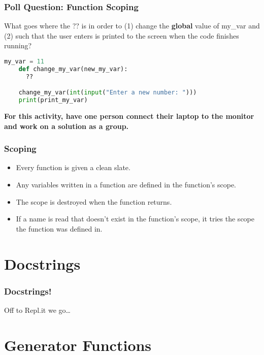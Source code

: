 \documentclass{beamer}
\begin{document}
%
%
%
\begin{frame}[fragile]
  \frametitle{Poll Question: Function Scoping}
  What goes where the ?? is in order to (1) change the \textbf{global} value of my\_var and (2) such that the user enters is printed to the screen when the code finishes running?
  \begin{lstlisting}[language=Python, autogobble]
    my_var = 11
    def change_my_var(new_my_var):
      ??

    change_my_var(int(input("Enter a new number: ")))
    print(print_my_var)
  \end{lstlisting}
  \vfill
  \textbf{For this activity, have one person connect their laptop to the monitor and work on a solution as a group.}
\end{frame}

%
%
\begin{frame}[fragile]
  \frametitle{Scoping}
  \begin{itemize}
    \item Every function is given a clean slate.
    \item Any variables written in a function are defined in the function's scope.
    \item The scope is destroyed when the function returns.
    \item If a name is read that doesn't exist in the function's scope, it tries the scope the function was defined in.
  \end{itemize}
\end{frame}

\section{Docstrings}
%
%
\begin{frame}[fragile]
  \frametitle{Docstrings!}
  \centering
  Off to Repl.it we go\ldots
\end{frame}

\section{Generator Functions}
\end{document}
